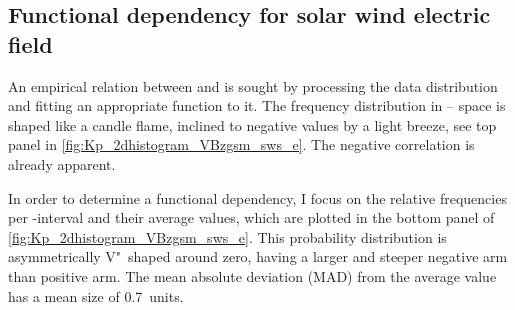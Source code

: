 \subsection{Functional dependency for solar wind electric field}
An empirical relation between \vBz{} and \Kp{} is sought by processing the data distribution and fitting an appropriate function to it.
The frequency distribution in \Kp--\vBz{} space is shaped like a candle flame, inclined to negative values by a light breeze, see top panel in \autoref{fig:Kp_2dhistogram_VBzgsm_sws_e}. The negative correlation is already apparent.
\begin{figure}
\end{figure}
In order to determine a functional dependency, I focus on the relative frequencies per \vBz-interval and their average \Kp{} values, which are plotted in the bottom panel of \autoref{fig:Kp_2dhistogram_VBzgsm_sws_e}. This probability distribution is asymmetrically V"~shaped around zero, having a larger and steeper negative arm than positive arm. The mean absolute deviation (MAD) from the average \Kp{} value has a mean size of \SI{0.7}{\Kp}~units.

